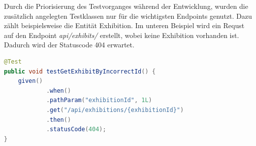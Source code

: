 Durch die Priorisierung des Testvorganges während der Entwicklung, wurden die zusätzlich angelegten Testklassen nur für die wichtigsten Endpoints genutzt. 
Dazu zählt beispielsweise die Entität Exhibition. 
Im unteren Beispiel wird ein Requst auf den Endpoint \emph{api/exhibits/} erstellt, wobei keine Exhibition vorhanden ist. 
Dadurch wird der Statuscode 404 erwartet. 
\begin{lstlisting}[label=Ein Exhibition Test, language=Java]
@Test
public void testGetExhibitByIncorrectId() {
    given()
            .when()
            .pathParam("exhibitionId", 1L)
            .get("/api/exhibitions/{exhibitionId}")
            .then()
            .statusCode(404);
}
\end{lstlisting}
